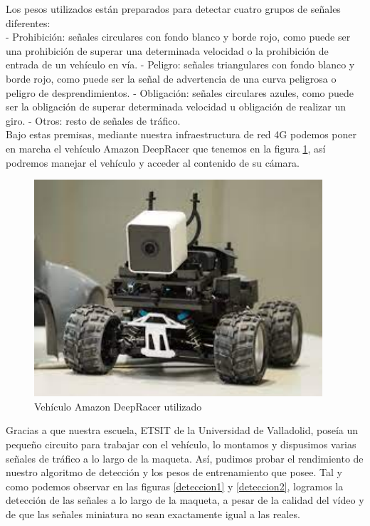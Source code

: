 Los pesos utilizados están preparados para detectar cuatro grupos de señales diferentes:\\

-	Prohibición: señales circulares con fondo blanco y borde rojo, como puede ser una prohibición de superar una determinada velocidad o la prohibición de entrada de un vehículo en vía.
-	Peligro: señales triangulares con fondo blanco y borde rojo, como puede ser la señal de advertencia de una curva peligrosa o peligro de desprendimientos.
-	Obligación: señales circulares azules, como puede ser la obligación de superar determinada velocidad u obligación de realizar un giro.
-	Otros: resto de señales de tráfico.\\

Bajo estas premisas, mediante nuestra infraestructura de red 4G podemos poner en marcha el vehículo Amazon DeepRacer que tenemos en la figura \ref{deepracer}, así podremos manejar el vehículo y acceder al contenido de su cámara.\\

\begin{figure}[H]
    \centering
 	\includegraphics[width=\textwidth]{Imagenes/IA/deepracer.pdf}
    \caption{Vehículo Amazon DeepRacer utilizado}
    \label{deepracer}
\end{figure}

Gracias a que nuestra escuela, ETSIT de la Universidad de Valladolid, poseía un pequeño circuito para trabajar con el vehículo, lo montamos y dispusimos varias señales de tráfico a lo largo de la maqueta. Así, pudimos probar el rendimiento de nuestro algoritmo de detección y los pesos de entrenamiento que posee. Tal y como podemos observar en las figuras \ref{deteccion1} y \ref{deteccion2}, logramos la detección de las señales a lo largo de la maqueta, a pesar de la calidad del vídeo y de que las señales miniatura no sean exactamente igual a las reales. \\

